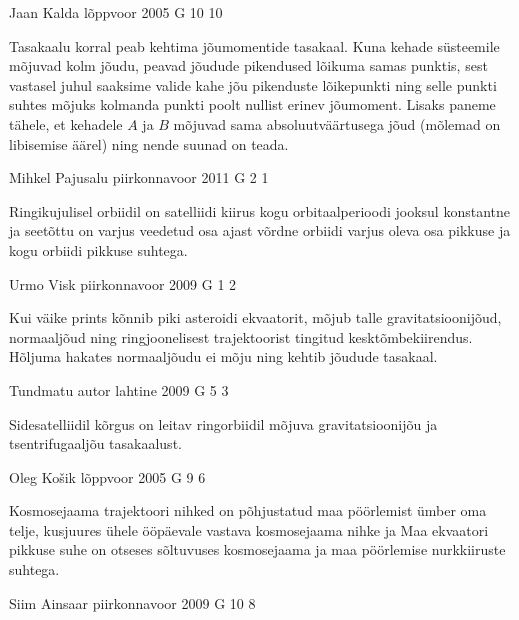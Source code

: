 \documentclass[11pt]{article}
\begin{document}
{%
{Jaan Kalda} %
{lõppvoor} %
{2005} %
{G 10} %
{10} %
{

\ifHint
Tasakaalu korral peab kehtima jõumomentide tasakaal. Kuna kehade süsteemile mõjuvad kolm jõudu, peavad jõudude pikendused lõikuma samas punktis, sest vastasel juhul saaksime valide kahe jõu pikenduste lõikepunkti ning selle punkti suhtes mõjuks kolmanda punkti poolt nullist erinev jõumoment. Lisaks paneme tähele, et kehadele $A$ ja $B$ mõjuvad sama absoluutväärtusega jõud (mõlemad on libisemise äärel) ning nende suunad on teada.
\fi
}

{Mihkel Pajusalu} %
{piirkonnavoor} %
{2011} %
{G 2} %
{1} %
{

\ifHint
Ringikujulisel orbiidil on satelliidi kiirus kogu orbitaalperioodi jooksul konstantne ja seetõttu on varjus veedetud osa ajast võrdne orbiidi varjus oleva osa pikkuse ja kogu orbiidi pikkuse suhtega.
\fi
}

{Urmo Visk} %
{piirkonnavoor} %
{2009} %
{G 1} %
{2} %
{

\ifHint
Kui väike prints kõnnib piki asteroidi ekvaatorit, mõjub talle gravitatsioonijõud, normaaljõud ning ringjoonelisest trajektoorist tingitud kesktõmbekiirendus. Hõljuma hakates normaaljõudu ei mõju ning kehtib jõudude tasakaal.
\fi
}

{Tundmatu autor} %
{lahtine} %
{2009} %
{G 5} %
{3} %
{

\ifHint
Sidesatelliidil kõrgus on leitav ringorbiidil mõjuva gravitatsioonijõu ja tsentrifugaaljõu tasakaalust.
\fi
}

{Oleg Košik} %
{lõppvoor} %
{2005} %
{G 9} %
{6} %
{

\ifHint
Kosmosejaama trajektoori nihked on põhjustatud maa pöörlemist ümber oma telje, kusjuures ühele ööpäevale vastava kosmosejaama nihke ja Maa ekvaatori pikkuse suhe on otseses sõltuvuses kosmosejaama ja maa pöörlemise nurkkiiruste suhtega.
\fi
}

{Siim Ainsaar} %
{piirkonnavoor} %
{2009} %
{G 10} %
{8} %
{

}}
\end{document}
